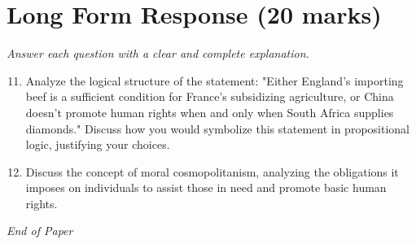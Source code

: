 \documentclass[12pt]{article}
\begin{document}
\section*{Long Form Response (20 marks)}
\textit{Answer each question with a clear and complete explanation.}
\begin{enumerate}[label=\arabic*.]
\setcounter{enumi}{10}
\item Analyze the logical structure of the statement: "Either England's importing beef is a sufficient condition for France's subsidizing agriculture, or China doesn't promote human rights when and only when South Africa supplies diamonds." Discuss how you would symbolize this statement in propositional logic, justifying your choices.
\item Discuss the concept of moral cosmopolitanism, analyzing the obligations it imposes on individuals to assist those in need and promote basic human rights.
\end{enumerate}

\vfill
\noindent\textit{End of Paper}
\end{document}
